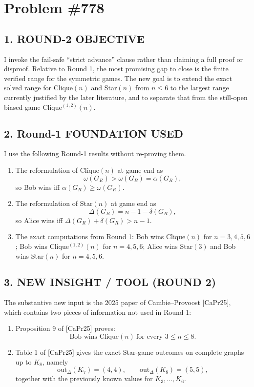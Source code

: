 \section{Problem \#778}

\subsection*{1. ROUND-2 OBJECTIVE}

I invoke the fail-safe ``strict advance'' clause rather than claiming a full proof or disproof. Relative to Round 1, the most promising gap to close is the finite verified range for the symmetric games. The new goal is to extend the exact solved range for Clique$(n)$ and Star$(n)$ from $n \leq 6$ to the largest range currently justified by the later literature, and to separate that from the still-open biased game Clique$^{(1,2)}(n)$.

\subsection*{2. Round-1 FOUNDATION USED}

I use the following Round-1 results without re-proving them.

\begin{enumerate}
\item The reformulation of Clique$(n)$ at game end as
\[
\omega(G_R) > \omega(G_B) = \alpha(G_R),
\]
so Bob wins iff $\alpha(G_R)\geq \omega(G_R)$.
\item The reformulation of Star$(n)$ at game end as
\[
\Delta(G_B)=n-1-\delta(G_R),
\]
so Alice wins iff $\Delta(G_R)+\delta(G_R)>n-1$.
\item The exact computations from Round 1:
Bob wins Clique$(n)$ for $n=3,4,5,6$; Bob wins Clique$^{(1,2)}(n)$ for $n=4,5,6$; Alice wins Star$(3)$ and Bob wins Star$(n)$ for $n=4,5,6$.
\end{enumerate}

\subsection*{3. NEW INSIGHT / TOOL (ROUND 2)}

The substantive new input is the 2025 paper of Cambie--Provoost [CaPr25], which contains two pieces of information not used in Round 1:

\begin{enumerate}
\item Proposition 9 of [CaPr25] proves:
\[
\mbox{Bob wins Clique}(n)\ \mbox{for every } 3 \leq n \leq 8.
\]
\item Table 1 of [CaPr25] gives the exact Star-game outcomes on complete graphs up to $K_8$, namely
\[
\mathrm{out}_{\Delta}(K_7)=(4,4), \qquad \mathrm{out}_{\Delta}(K_8)=(5,5),
\]
together with the previously known values for $K_3,\dots,K_6$.
\end{enumerate}

